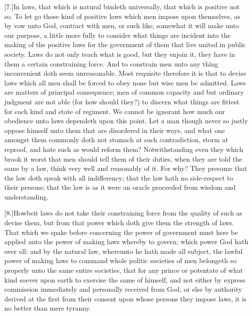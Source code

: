 [7.]In laws, that which is natural bindeth universally, that which is positive not so. To let go those kind of positive  laws which men impose upon themselves, as by vow unto God, contract with men, or such like; somewhat it will make unto our purpose, a little more fully to consider what things are incident into the making of the positive laws for the government of them that live united in public society. Laws do not only teach what is good, but they enjoin it, they have in them a certain constraining force. And to constrain men unto any thing inconvenient doth seem unreasonable. Most requisite therefore it is that to devise laws which all men shall be forced to obey none but wise men be admitted. Laws are matters of principal consequence; men of common capacity and but ordinary judgment are not able (for how should they?) to discern what things are fittest for each kind and state of regiment. We cannot be ignorant how much our obedience unto laws dependeth upon this point. Let a man though never so justly oppose himself unto them that are disordered in their ways, and what one amongst them commonly doth not stomach at such contradiction, storm at reproof, and hate such as would reform them? Notwithstanding even they which brook it worst that men should tell them of their duties, when they are told the same by a law, think very well and reasonably of it. For why? They presume that the law doth speak with all indifferency; that the law hath no side-respect to their persons; that the law is as it were an oracle proceeded from wisdom and understanding.

[8.]Howbeit laws do not take their constraining force from the quality of such as devise them, but from that power which doth give them the strength of laws. That which we spake before concerning the power of government must here be applied unto the power of making laws whereby to govern; which power God hath over all: and by the natural law, whereunto he hath made all subject, the lawful power of making laws to command whole politic societies of men belongeth so properly unto the same entire societies, that for any prince or potentate of what kind soever upon earth to exercise the same of himself, and not either by express commission immediately and personally received from God, or else by authority derived at the first from  their consent upon whose persons they impose laws, it is no better than mere tyranny.

